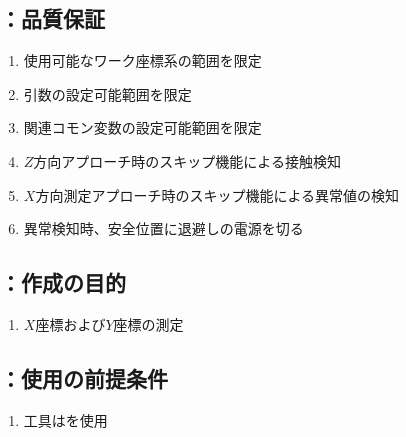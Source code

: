 \subsection{\MXIface：品質保証}
\begin{enumerate}[label*=\sarrow]
\item 使用可能なワーク座標系の範囲を限定
\item {}引数の設定可能範囲を限定
\item 関連コモン変数の設定可能範囲を限定
\item $Z$方向アプローチ時のスキップ機能による接触検知
\item $X$方向測定アプローチ時のスキップ機能による異常値の検知
\item 異常検知時、安全位置に退避し\TouchSensorProbe の電源を切る
\end{enumerate}



\clearpage


\subsection{\MCenterline：作成の目的}
\begin{enumerate}[label*=\sarrow]
\item \CenterlineEndFaceDif $X$座標および$Y$座標の測定
\end{enumerate}


\subsection{\MCenterline：使用の前提条件}
\begin{enumerate}[label*=\sarrow]
\item 工具は\TouchSensorProbe を使用
\end{enumerate}


